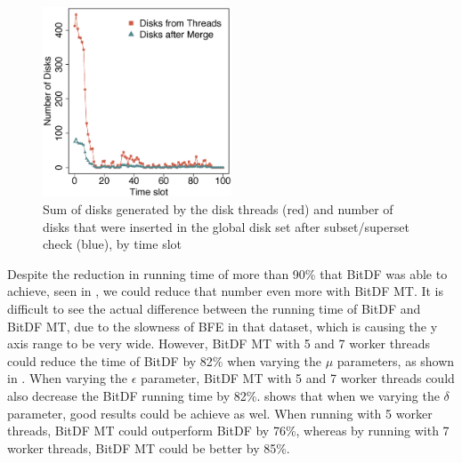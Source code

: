 {\begin{figure}[h!]
    \centering
    \includegraphics[width=0.5\textwidth]{images/Brinkhoff_disks_threads.eps}
    \caption{Sum of disks generated by the disk threads (red) and number of disks that were inserted in the global disk
        set after subset/superset check (blue), by time slot}
    \label{fig:brinkhoff_disks_threads}
\end{figure}

Despite the reduction in running time of more than 90\% that BitDF was able to achieve, seen in ,
we could reduce that number even more with BitDF MT. It is difficult to see the actual difference between the running
time of BitDF and BitDF MT, due to the slowness of BFE in that dataset, which is causing the y axis range to be very
wide. However, BitDF MT with 5 and 7 worker threads could reduce the time of BitDF by 82\% when varying the $\mu$
parameters, as shown in . When varying the $\epsilon$ parameter, BitDF MT with 5
and 7 worker threads could also decrease the BitDF running time by 82\%.  shows
that when we varying the $\delta$ parameter, good results could be achieve as wel. When running with 5 worker threads,
BitDF MT could outperform BitDF by 76\%, whereas by running with 7 worker threads, BitDF MT could be better by 85\%.

}
